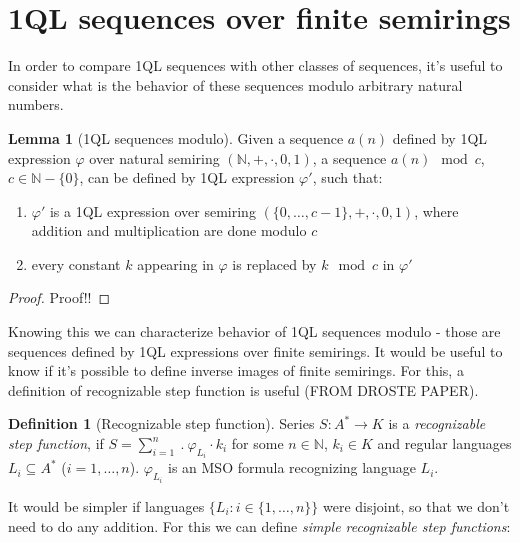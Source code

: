 \documentclass[12pt]{article}
\theoremstyle{definition}
\newtheorem{definition}{Definition}[section]
\newtheorem{lemma}[theorem]{Lemma}
\begin{document}

\section{1QL sequences over finite semirings}
In order to compare 1QL sequences with other classes of sequences, it's useful to consider what is the behavior of these sequences modulo arbitrary natural numbers.

\begin{lemma}[1QL sequences modulo]
    Given a sequence $a(n)$ defined by 1QL expression $\varphi$ over natural semiring $(\mathbb{N}, +, \cdot, 0, 1)$, a sequence $a(n) \mod c$, $c \in \mathbb{N} - \{0\}$, can be defined by 1QL expression $\varphi'$, such that:
    \begin{enumerate}
        \item $\varphi'$ is a 1QL expression over semiring $(\{0,\ldots,c-1\}, +, \cdot, 0, 1)$, where addition and multiplication are done modulo $c$
        \item every constant $k$ appearing in $\varphi$ is replaced by $k \mod c$ in $\varphi'$
    \end{enumerate}
\end{lemma}

\begin{proof}
    Proof!!
\end{proof}

Knowing this we can characterize behavior of 1QL sequences modulo - those are sequences defined by 1QL expressions over finite semirings. It would be useful to know if it's possible to define inverse images of finite semirings. For this, a definition of recognizable step function is useful (FROM DROSTE PAPER).

\begin{definition}[Recognizable step function]
    Series $S: A^* \rightarrow K$ is a \textit{recognizable step function}, if $S = \sum_{i = 1}^{n} \ . \ \varphi_{L_i} \cdot k_i$ for some $n \in \mathbb{N}$, $k_i \in K$ and regular languages $L_i \subseteq A^*$ ($i=1,\ldots,n$). $\varphi_{L_i}$ is an MSO formula recognizing language $L_i$.
\end{definition}

It would be simpler if languages $\{L_i : i \in \{1,\ldots,n\}\}$ were disjoint, so that we don't need to do any addition. For this we can define \textit{simple recognizable step functions}:
\end{document}
